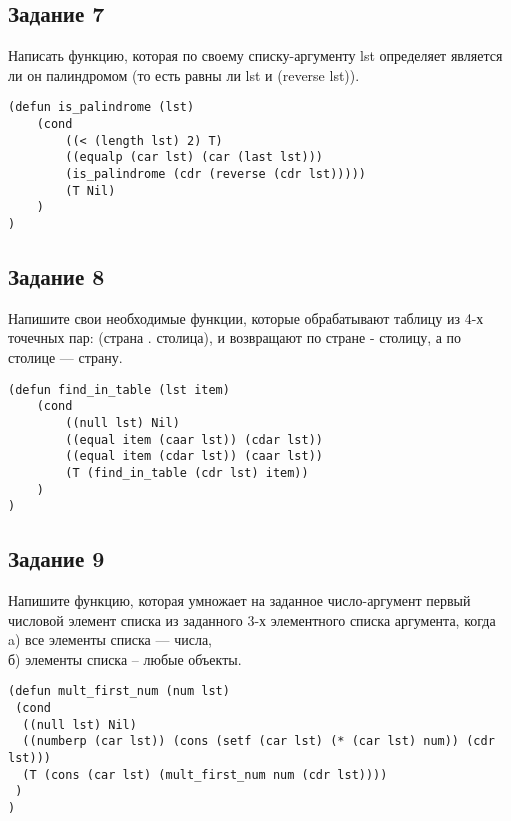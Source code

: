 \subsection*{Задание 7}

Написать функцию, которая по своему списку-аргументу lst определяет является ли он палиндромом (то есть равны ли lst и (reverse lst)).

\begin{lstlisting}
(defun is_palindrome (lst)
    (cond
        ((< (length lst) 2) T)
        ((equalp (car lst) (car (last lst)))
        (is_palindrome (cdr (reverse (cdr lst)))))
        (T Nil)
    )
)
\end{lstlisting}

\subsection*{Задание 8}

Напишите свои необходимые функции, которые обрабатывают таблицу из 4-х точечных пар: (страна . столица), и возвращают по стране - столицу, а по столице — страну.

\begin{lstlisting}
(defun find_in_table (lst item)
    (cond
        ((null lst) Nil)
        ((equal item (caar lst)) (cdar lst))
        ((equal item (cdar lst)) (caar lst))
        (T (find_in_table (cdr lst) item))
    )
)
\end{lstlisting}

\subsection*{Задание 9}

Напишите функцию, которая умножает на заданное число-аргумент первый числовой элемент списка из заданного 3-х элементного списка аргумента, когда \\
a) все элементы списка --- числа, \\
б) элементы списка -- любые объекты.

\begin{lstlisting}
(defun mult_first_num (num lst)
 (cond
  ((null lst) Nil)
  ((numberp (car lst)) (cons (setf (car lst) (* (car lst) num)) (cdr lst)))
  (T (cons (car lst) (mult_first_num num (cdr lst))))
 )
)
\end{lstlisting}